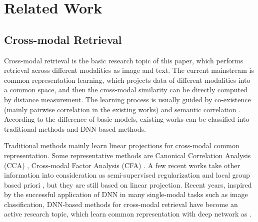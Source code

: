 \documentclass{article}
\begin{document}
\section{Related Work}

\subsection{Cross-modal Retrieval}
Cross-modal retrieval is the basic research topic of this paper, which performs retrieval across different modalities as image and text. The current mainstream is common representation learning, which projects data of different modalities into a common space, and then the cross-modal similarity can be directly computed by distance measurement. 
The learning process is usually guided by co-existence (mainly pairwise correlation in the existing works) \cite{HotelingBiometrika36RelationBetweenTwoVariates,LiMM03CFA,ngiam32011multimodal,feng12014cross} and semantic correlation \cite{RasiwasiaMM10SemanticCCA,DBLP:journals/tmm/KangXLXP15,DBLP:conf/ijcai/PengHQ16}.  
According to the difference of basic models, existing works can be classified into traditional methods and DNN-based methods.

Traditional methods mainly learn linear projections for cross-modal common representation. Some representative methods are Canonical Correlation Analysis (CCA) \cite{HotelingBiometrika36RelationBetweenTwoVariates}, Cross-modal Factor Analysis (CFA) \cite{LiMM03CFA}. %
A few recent works take other information into consideration as semi-supervised regularization \cite{ZhaiTCSVT2014JRL} and local group based priori \cite{DBLP:journals/tmm/KangXLXP15}, but they are still based on linear projection. Recent years, inspired by the successful application of DNN in many single-modal tasks such as image classification, DNN-based methods for cross-modal retrieval have become an active research topic, which learn common representation with deep network as \cite{ngiam32011multimodal,kim2012learning,DBLP:conf/ijcai/WangCO015,DBLP:conf/ijcai/PengHQ16,DBLP:journals/tcyb/ZLWLZY17}. 
\end{document}
